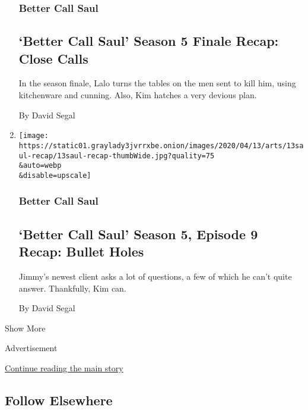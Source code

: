 \begin{enumerate}
{  \subsubsection{Better Call Saul}\label{better-call-saul}}

  \hypertarget{better-call-saul-season-5-finale-recap-close-calls}{%
  \subsection{`Better Call Saul' Season 5 Finale Recap: Close
  Calls}\label{better-call-saul-season-5-finale-recap-close-calls}}

  In the season finale, Lalo turns the tables on the men sent to kill
  him, using kitchenware and cunning. Also, Kim hatches a very devious
  plan.

  By David Segal
\item
  \href{/2020/04/13/arts/television/better-call-saul-episode-9-recap.html}{}

  \texttt{[image: https://static01.graylady3jvrrxbe.onion/images/2020/04/13/arts/13saul-recap/13saul-recap-thumbWide.jpg?quality=75\\\&auto=webp\\\&disable=upscale]}

  \hypertarget{better-call-saul-1}{%
  \subsubsection{Better Call Saul}\label{better-call-saul-1}}

  \hypertarget{better-call-saul-season-5-episode-9-recap-bullet-holes}{%
  \subsection{`Better Call Saul' Season 5, Episode 9 Recap: Bullet
  Holes}\label{better-call-saul-season-5-episode-9-recap-bullet-holes}}

  Jimmy's newest client asks a lot of questions, a few of which he can't
  quite answer. Thankfully, Kim can.

  By David Segal
\end{enumerate}

Show More

Advertisement

\protect\hyperlink{after-mid2}{Continue reading the main story}

\hypertarget{follow-elsewhere}{%
\subsection{Follow Elsewhere}\label{follow-elsewhere}}

